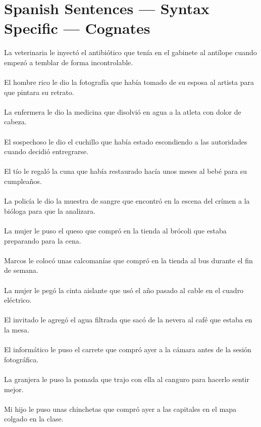 \section{Spanish Sentences --- Syntax Specific --- Cognates}
La veterinaria le inyect\'{o} el antibi\'{o}tico que ten\'{i}a en el gabinete al ant\'{i}lope cuando empez\'{o} a temblar de forma incontrolable.	\\	\\
El hombre rico le dio la fotograf\'{i}a que hab\'{i}a tomado de su esposa al artista para que pintara su retrato.	\\	\\
La enfermera le dio la medicina que disolvi\'{o} en agua a la atleta con dolor de cabeza.	\\	\\
El sospechoso le dio el cuchillo que hab\'{i}a estado escondiendo a las autoridades cuando decidi\'{o} entregrarse.	\\	\\
El t\'{i}o le regal\'{o} la cuna que hab\'{i}a restaurado hac\'{i}a unos meses al bebé para su cumplea\~{n}os.	\\	\\
La polic\'{i}a le dio la muestra de sangre que encontr\'{o} en la escena del cr\'{i}men a la bi\'{o}loga para que la analizara.	\\	\\
La mujer le puso el queso que compr\'{o} en la tienda al br\'{o}coli que estaba preparando para la cena.	\\	\\
Marcos le coloc\'{o} unas calcoman\'{i}as que compr\'{o} en la tienda al bus durante el fin  de semana.	\\	\\
La mujer le peg\'{o} la cinta aislante que us\'{o} el a\~{n}o pasado al cable en el cuadro eléctrico.	\\	\\
El invitado le agreg\'{o} el agua filtrada que sac\'{o} de la nevera al café que estaba en la mesa.	\\	\\
El inform\'{a}tico le puso el carrete que compr\'{o} ayer a la c\'{a}mara antes de la sesi\'{o}n fotogr\'{a}fica.	\\	\\
La granjera le puso la pomada que trajo con ella al canguro para hacerlo sentir mejor.	\\	\\
Mi hijo le puso unas chinchetas que compr\'{o} ayer a las capitales en el mapa colgado en la clase.	\\	\\
